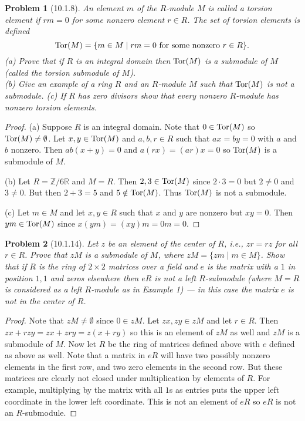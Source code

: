 \documentclass{article}
\newcommand{\tor}{\textup{Tor}}
\newtheorem{problem}{Problem}
\begin{document}
\begin{problem}[10.1.8]
An element $m$ of the $R$-module $M$ is called a \emph{torsion element} if $rm = 0$ for some nonzero element $r \in R$. The set of torsion elements is defined
\[
\tor(M) = \{m \in M \mid rm = 0 \text{ for some nonzero } r \in R\}.
\]
(a) Prove that if $R$ is an integral domain then $\tor(M)$ is a submodule of $M$ (called the \emph{torsion} submodule of $M$).\\
(b) Give an example of a ring $R$ and an $R$-module $M$ such that $\tor(M)$ is not a submodule.
(c) If $R$ has zero divisors show that every nonzero $R$-module has nonzero torsion elements.
\end{problem}
\begin{proof}
(a) Suppose $R$ is an integral domain. Note that $0 \in \tor(M)$ so $\tor(M) \neq \emptyset$. Let $x,y \in \tor(M)$ and $a,b,r \in R$ such that $ax = by = 0$ with $a$ and $b$ nonzero. Then $ab(x+y) = 0$ and $a(rx) = (ar)x = 0$ so $\tor(M)$ is a submodule of $M$.

(b) Let $R = \mathbb{Z}/6\mathbb{R}$ and $M = R$. Then $2,3 \in \tor(M)$ since $2 \cdot 3 = 0$ but $2 \neq 0$ and $3 \neq 0$. But then $2 + 3 = 5$ and $5 \notin \tor(M)$. Thus $\tor(M)$ is not a submodule.

(c) Let $m \in M$ and let $x,y \in R$ such that $x$ and $y$ are nonzero but $xy = 0$. Then $ym \in \tor(M)$ since $x(ym) = (xy)m = 0m = 0$.
\end{proof}

\begin{problem}[10.1.14]
Let $z$ be an element of the center of $R$, i.e., $zr = rz$ for all $r \in R$. Prove that $zM$ is a submodule of $M$, where $zM = \{zm \mid m \in M\}$. Show that if $R$ is the ring of $2 \times 2$ matrices over a field and $e$ is the matrix with a $1$ in position $1,1$ and zeros elsewhere then $eR$ is \emph{not} a left $R$-submodule (where $M = R$ is considered as a left $R$-module as in Example 1) --- in this case the matrix $e$ is not in the center of $R$.
\end{problem}
\begin{proof}
Note that $zM \neq \emptyset$ since $0 \in zM$. Let $zx,zy \in zM$ and let $r \in R$. Then $zx + rzy = zx + zry = z(x + ry)$ so this is an element of $zM$ as well and $zM$ is a submodule of $M$. Now let $R$ be the ring of matrices defined above with $e$ defined as above as well. Note that a matrix in $eR$ will have two possibly nonzero elements in the first row, and two zero elements in the second row. But these matrices are clearly not closed under multiplication by elements of $R$. For example, multiplying by the matrix with all $1$s as entries puts the upper left coordinate in the lower left coordinate. This is not an element of $eR$ so $eR$ is not an $R$-submodule.
\end{proof}
\end{document}
